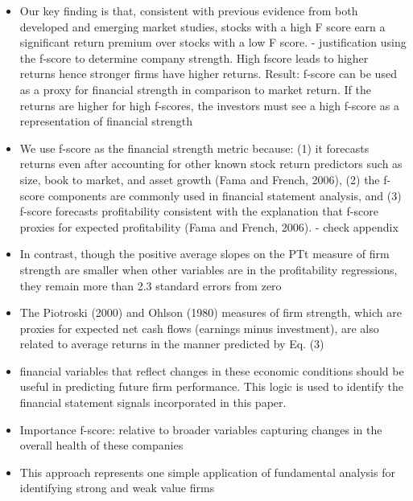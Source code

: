 \documentclass[12pt]{article}
\begin{document}
        \begin{itemize}

            \item Our key finding is that, consistent with previous evidence from both developed and emerging market studies, stocks with a high F score earn a significant return premium over stocks with a low F score. \citep{Hyde2014} - justification using the f-score to determine company strength. High fscore leads to higher returns hence stronger firms have higher returns. Result: f-score can be used as a proxy for financial strength in comparison to market return. If the returns are higher for high f-scores, the investors must see a high f-score as a representation of financial strength

            \item We use f-score as the financial strength metric because: (1) it forecasts returns even after accounting for other known stock return predictors such as size, book to market, and asset growth (Fama and French, 2006), (2) the f-score components are commonly used in financial statement analysis, and (3) f-score forecasts profitability consistent with the explanation that f-score proxies for expected profitability (Fama and French, 2006).\citep{Choi2012} - check appendix 

            \item In contrast, though the positive average slopes on the PTt measure of firm strength are smaller when other variables are in the profitability regressions, they remain more than 2.3 standard errors from zero \citep{Fama2006}

            \item The Piotroski (2000) and Ohlson (1980) measures of firm strength, which are proxies for expected net cash flows (earnings minus investment), are also related to average returns in the manner predicted by Eq. (3) \citep{Fama2006}

            \item financial variables that reflect changes in these economic conditions should be useful in predicting future firm performance. This logic is used to identify the financial statement signals incorporated in this paper. \citep{Piotroski2000}

            \item Importance f-score: relative to broader variables capturing changes in the overall health of these companies \citep{Piotroski2000}

            \item This approach represents one simple application of fundamental analysis for identifying strong and weak value firms \citep{Piotroski2000}


\end{itemize}
\end{document}
